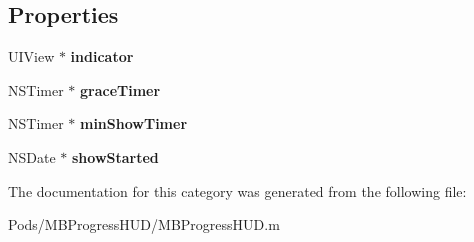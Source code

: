 \subsection*{Properties}
\begin{DoxyCompactItemize}
\item 
\mbox{\label{category_m_b_progress_h_u_d_07_08_a88f0841ae8c0e93249afc68954859072}} 
U\+I\+View $\ast$ {\bfseries indicator}
\item 
\mbox{\label{category_m_b_progress_h_u_d_07_08_a856da5d6ea8f970c9f79cd43f8f4e3d7}} 
N\+S\+Timer $\ast$ {\bfseries grace\+Timer}
\item 
\mbox{\label{category_m_b_progress_h_u_d_07_08_ae0ef7ca861bf900eaed11b57ad49eddc}} 
N\+S\+Timer $\ast$ {\bfseries min\+Show\+Timer}
\item 
\mbox{\label{category_m_b_progress_h_u_d_07_08_a45366644943d7cd700062c755ceef991}} 
N\+S\+Date $\ast$ {\bfseries show\+Started}
\end{DoxyCompactItemize}


The documentation for this category was generated from the following file\+:\begin{DoxyCompactItemize}
\item 
Pods/\+M\+B\+Progress\+H\+U\+D/M\+B\+Progress\+H\+U\+D.\+m\end{DoxyCompactItemize}
